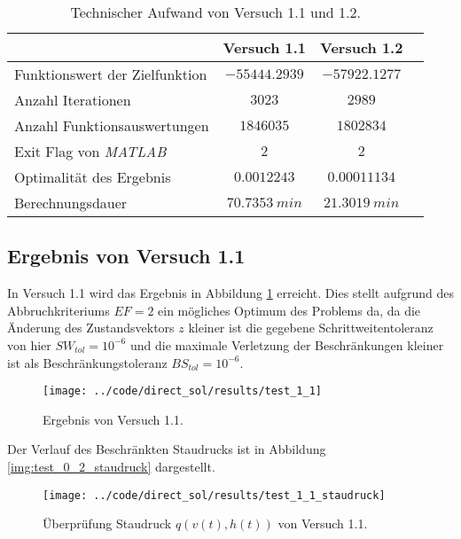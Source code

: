\begin{table}[H]
    \centering
    \caption{Technischer Aufwand von Versuch 1.1 und 1.2.}\label{tab:Versuch1_TA}
    \begin{tabularx}{.9\textwidth}{Zccc}
        \toprule
         & \textbf{Versuch 1.1} & \textbf{Versuch 1.2} \\
        \midrule
        Funktionswert der Zielfunktion & $-55444.2939$ & $-57922.1277$ \\
        Anzahl Iterationen & $3023$ & $2989$ \\
        Anzahl Funktionsauswertungen & $1846035$ & $1802834$ \\
        Exit Flag von \textit{MATLAB} & $2$ & $2$ \\
        Optimalität des Ergebnis & $0.0012243$ & $0.00011134$ \\
        Berechnungsdauer & $70.7353 \ min$ & $21.3019 \ min$ \\
        \bottomrule
    \end{tabularx}
\end{table}




\subsection{Ergebnis von Versuch 1.1}\label{kap:Versuch11}
In Versuch 1.1 wird das Ergebnis in Abbildung \ref{img:test_1_1} erreicht. Dies stellt aufgrund des Abbruchkriteriums $EF = 2$ ein mögliches Optimum des Problems da, da die Änderung des Zustandsvektors $z$ kleiner ist die gegebene Schrittweitentoleranz von hier $SW_{tol} = 10^{-6}$ und die maximale Verletzung der Beschränkungen kleiner ist als Beschränkungstoleranz $BS_{tol} = 10^{-6}$.
\begin{figure}[H]
\begin{center}
\texttt{[image: ../code/direct\_sol/results/test\_1\_1]}
\caption{Ergebnis von Versuch 1.1.}\label{img:test_1_1}
\end{center}
\end{figure}
Der Verlauf des Beschränkten Staudrucks ist in Abbildung \ref{img:test_0_2_staudruck} dargestellt.
\begin{figure}[H]
\begin{center}
\texttt{[image: ../code/direct\_sol/results/test\_1\_1\_staudruck]}
\caption{Überprüfung Staudruck $q(v(t),h(t))$ von Versuch 1.1.}\label{img:test_1_1_staudruck}
\end{center}
\end{figure}




